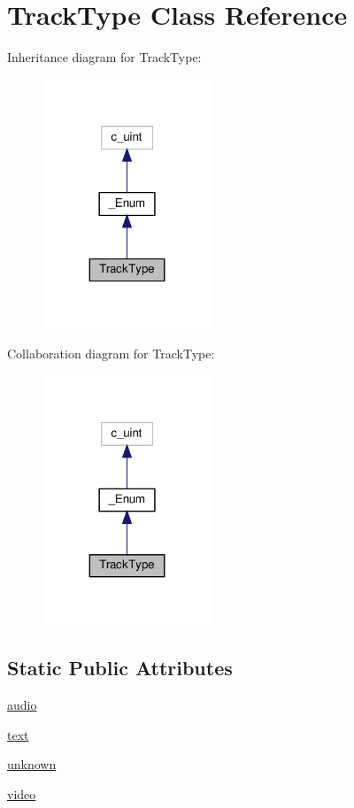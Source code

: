 \hypertarget{classvlc_1_1_track_type}{}\section{Track\+Type Class Reference}
\label{classvlc_1_1_track_type}


Inheritance diagram for Track\+Type\+:
\nopagebreak
\begin{figure}[H]
\begin{center}
\leavevmode
\includegraphics[width=143pt]{classvlc_1_1_track_type__inherit__graph}
\end{center}
\end{figure}


Collaboration diagram for Track\+Type\+:
\nopagebreak
\begin{figure}[H]
\begin{center}
\leavevmode
\includegraphics[width=143pt]{classvlc_1_1_track_type__coll__graph}
\end{center}
\end{figure}
\subsection*{Static Public Attributes}
\begin{DoxyCompactItemize}
\item 
\hyperlink{classvlc_1_1_track_type_ae7198e2df6ed905cb7395d0eff5d5d20}{audio}
\item 
\hyperlink{classvlc_1_1_track_type_af575f17e6be3f269b86b041a60560dbf}{text}
\item 
\hyperlink{classvlc_1_1_track_type_ac4bf32b8437be41aff6333570bb45edd}{unknown}
\item 
\hyperlink{classvlc_1_1_track_type_abb2fd43e6da5bee9edb1e75519db7a3d}{video}
\end{DoxyCompactItemize}
